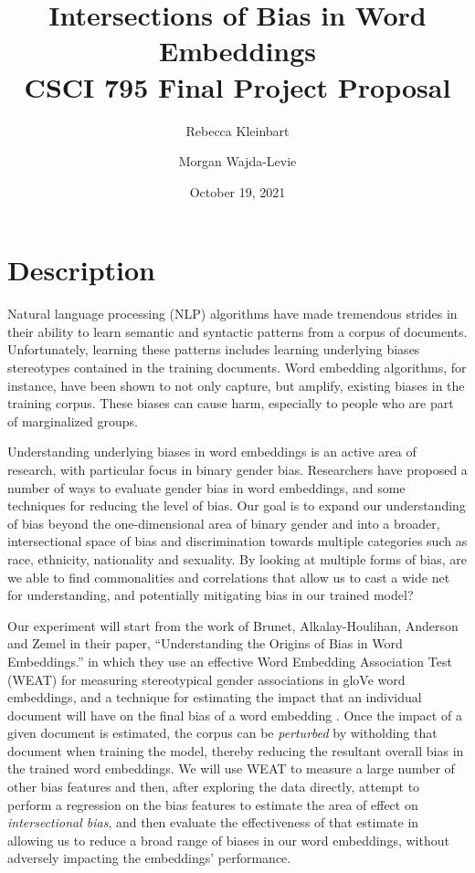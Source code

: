 \documentclass{article}
\title{Intersections of Bias in Word Embeddings\\
    \Large{CSCI 795 Final Project Proposal}}
\date{October 19, 2021}
\author{Rebecca Kleinbart \and Morgan Wajda-Levie}
\begin{document}
\maketitle

\section{Description}

Natural language processing (NLP) algorithms have made tremendous strides in
their ability to learn semantic and syntactic patterns from a corpus of
documents. Unfortunately, learning these patterns includes learning underlying
biases stereotypes contained in the training documents. Word embedding
algorithms, for instance, have been shown to not only capture, but
amplify, existing biases in the training
corpus\cite{caliskan_semantics_2017}. These biases can cause harm,
especially to people who are part of marginalized groups.

Understanding underlying biases in word embeddings is an active area of
research, with particular focus in binary gender bias. Researchers have
proposed a number of ways to evaluate gender bias in word embeddings,
and some techniques for reducing the level of
bias\cite{caliskan_semantics_2017, brunet_understanding_2019,
gonen_lipstick_2019, badilla_wefe_2020}. Our goal is to
expand our understanding of bias beyond the one-dimensional area of
binary gender and into a broader, intersectional space of bias and
discrimination towards multiple categories such as race, ethnicity,
nationality and sexuality. By looking at multiple forms of bias, are we
able to find commonalities and correlations that allow us to cast a wide
net for understanding, and potentially mitigating bias in our trained
model?

Our experiment will start from the work of Brunet, Alkalay-Houlihan,
Anderson and Zemel in their paper, ``Understanding the Origins of Bias
in Word Embeddings.'' in which they use an effective Word Embedding
Association Test (WEAT) for measuring stereotypical gender associations
in gloVe word embeddings, and a technique for estimating the impact that
an individual document will have on the final bias of a word embedding%
\cite{brunet_understanding_2019}. Once the impact of a given document is
estimated, the corpus can be \emph{perturbed} by witholding that
document when training the model, thereby reducing the resultant overall
bias in the trained word embeddings. We will use WEAT to measure a large
number of other bias features and then, after exploring the data
directly, attempt to perform a regression on the bias features to
estimate the area of effect on \emph{intersectional bias}, and then
evaluate the effectiveness of that estimate in allowing us to reduce a
broad range of biases in our word embeddings, without adversely
impacting the embeddings' performance.
\end{document}
